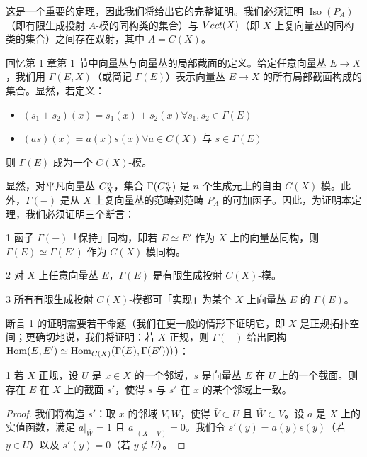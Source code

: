 这是一个重要的定理，因此我们将给出它的完整证明。我们必须证明 $\operatorname{Iso}(P_A)$（即有限生成投射 $A$-模的同构类的集合）与 $Vect(X)$（即 $X$ 上复向量丛的同构类的集合）之间存在双射，其中 $A = C(X)$。

回忆第 1 章第 1 节中向量丛与向量丛的局部截面的定义。给定任意向量丛 $E \to X$，我们用 $\Gamma(E, X)$（或简记 $\Gamma(E)$）表示向量丛 $E \to X$ 的所有局部截面构成的集合。显然，若定义：
\begin{itemize}
\item $(s_1 + s_2)(x) = s_1(x) + s_2(x)\forall s_1, s_2 \in \Gamma(E)$
\item $(as)(x) = a(x)s(x)\forall a \in C(X)$ 与 $s \in \Gamma(E)$
\end{itemize}
则 $\Gamma(E)$ 成为一个 $C(X)$-模。

显然，对平凡向量丛 $C^n_X$，集合 $\Gamma(C^n_X)$ 是 $n$ 个生成元上的自由 $C(X)$-模。此外，$\Gamma(-)$ 是从 $X$ 上复向量丛的范畴到范畴 $P_A$ 的可加函子。因此，为证明本定理，我们必须证明三个断言：

\begin{claim}{1} 函子 $\Gamma(-)$「保持」同构，即若 $E \simeq E'$ 作为 $X$ 上的向量丛同构，则 $\Gamma(E) \simeq \Gamma(E')$ 作为 $C(X)$-模同构。\end{claim}

\begin{claim}{2} 对 $X$ 上任意向量丛 $E$，$\Gamma(E)$ 是有限生成投射 $C(X)$-模。\end{claim}

\begin{claim}{3} 所有有限生成投射 $C(X)$-模都可「实现」为某个 $X$ 上向量丛 $E$ 的 $\Gamma(E)$。\end{claim}

断言 1 的证明需要若干命题（我们在更一般的情形下证明它，即 $X$ 是正规拓扑空间；更确切地说，我们将证明：若 $X$ 正规，则 $\Gamma(-)$ 给出同构 $\operatorname{Hom}(E, E') \simeq \operatorname{Hom}_{C(X)}(\Gamma(E), \Gamma(E')))$）：

\begin{lem}{1} 若 $X$ 正规，设 $U$ 是 $x \in X$ 的一个邻域，$s$ 是向量丛 $E$ 在 $U$ 上的一个截面。则存在 $E$ 在 $X$ 上的截面 $s'$，使得 $s$ 与 $s'$ 在 $x$ 的某个邻域上一致。\end{lem}

\begin{proof} 我们将构造 $s'$：取 $x$ 的邻域 $V, W$，使得 $\bar V \subset U$ 且 $\bar W \subset V$。设 $a$ 是 $X$ 上的实值函数，满足 $a|_{\bar W} = 1$ 且 $a|_{(X-V)} = 0$。我们令 $s'(y) = a(y)s(y)$（若 $y \in U$）以及 $s'(y) = 0$（若 $y \notin U$）。\end{proof}

